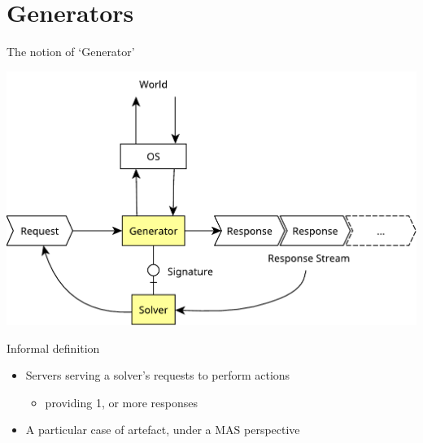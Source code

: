 \documentclass[presentation]{beamer}\mode<presentation>{\usetheme{AMSBolognaFC}}
\begin{document}
\section{Generators}

\begin{frame}[allowframebreaks]{The notion of `Generator'}
    \begin{center}
        \includegraphics[width=.7\linewidth]{figures/generator.pdf}
    \end{center}

    \begin{block}{Informal definition}
        \begin{itemize}
            \item Servers serving a solver's requests to perform actions
            \begin{itemize}
                \item providing 1, or more responses
            \end{itemize}
            \item A particular case of \alert{artefact}, under a MAS perspective
        \end{itemize}
    \end{block}


\end{frame}
\end{document}
